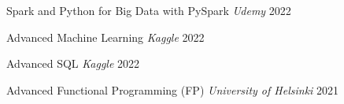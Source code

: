 

\begin{cvhonors}

  \cvhonor
    {Spark and Python for Big Data with PySpark} %
    {\textit{Udemy}} %
    {} %
    {2022} %

  \cvhonor
    {Advanced Machine Learning} %
    {\textit{Kaggle}} %
    {} %
    {2022} %

  \cvhonor
    {Advanced SQL} %
    {\textit{Kaggle}} %
    {} %
    {2022} %

  \cvhonor
    {Advanced Functional Programming (FP)} %
    {\textit{University of Helsinki}} %
    {} %
    {2021} %

\end{cvhonors}
